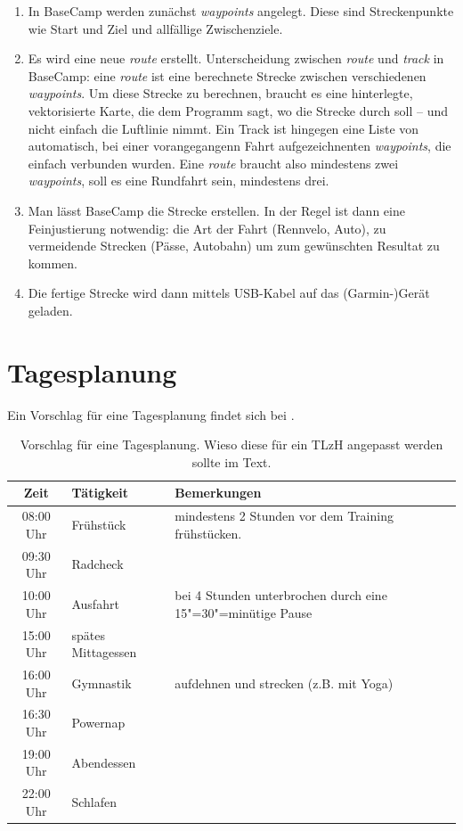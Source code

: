 \documentclass[a4paper,DIV13,BCOR0cm,draft=TRUE]{scrartcl}
\newcommand{\tlzh}{TLzH}
\begin{document}
\begin{enumerate}
  \item In BaseCamp werden zunächst \emph{waypoints} angelegt. Diese sind Streckenpunkte wie Start und Ziel
    und allfällige Zwischenziele.
  \item Es wird eine neue \emph{route} erstellt. Unterscheidung zwischen \emph{route} und \emph{track} in
    BaseCamp: eine \emph{route} ist eine berechnete Strecke zwischen verschiedenen \emph{waypoints}.
    Um diese Strecke zu berechnen, braucht es eine hinterlegte, vektorisierte Karte, die dem Programm
    sagt, wo die Strecke durch soll -- und nicht einfach die Luftlinie nimmt. Ein Track ist hingegen eine
    Liste von automatisch, bei einer vorangegangenn Fahrt aufgezeichnenten \emph{waypoints}, die 
    einfach verbunden wurden. Eine \emph{route} braucht also mindestens zwei \emph{waypoints}, 
    soll es eine Rundfahrt sein, mindestens drei.
  \item Man lässt BaseCamp die Strecke erstellen. In der Regel ist dann eine Feinjustierung notwendig:
    die Art der Fahrt (Rennvelo, Auto), zu vermeidende Strecken (Pässe, Autobahn) um zum
    gewünschten Resultat zu kommen.
  \item Die fertige Strecke wird dann mittels USB-Kabel auf das (Garmin-)Gerät geladen.
\end{enumerate}

\section{Tagesplanung}
\label{sec:tagesplanung}

Ein Vorschlag für eine Tagesplanung findet sich bei .

\begin{table}
  \centering
  \begin{tabular}{cll}
    \toprule
    Zeit & Tätigkeit & Bemerkungen \\
    \midrule
 08:00 Uhr & Frühstück & mindestens 2 Stunden vor dem Training frühstücken.\\
  09:30 Uhr & Radcheck & \\
  10:00 Uhr & Ausfahrt & bei 4 Stunden unterbrochen durch eine 15"=30"=minütige Pause \\
  15:00 Uhr & spätes Mittagessen & \\
  16:00 Uhr & Gymnastik & aufdehnen und strecken (z.B. mit Yoga) \\
  16:30 Uhr & Powernap & \\
  19:00 Uhr & Abendessen & \\
  22:00 Uhr & Schlafen & \\
    \bottomrule
  \end{tabular}
  \caption{Vorschlag für eine Tagesplanung. Wieso diese für ein \tlzh{} angepasst werden sollte im Text. }
  \label{tab:tagesplanboehme}
\end{table}
\end{document}
